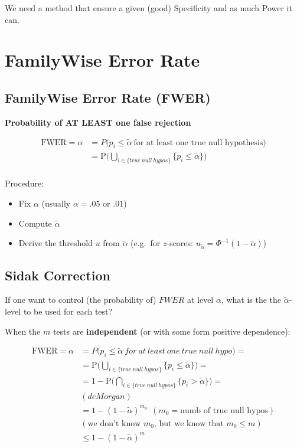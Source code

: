 \documentclass[]{article}
\providecommand{\tightlist}{%
  \setlength{\itemsep}{0pt}\setlength{\parskip}{0pt}}
\begin{document}
We need a method that ensure a given (good) Specificity and as much
Power it can.

\section{FamilyWise Error Rate}\label{familywise-error-rate}

\subsection{FamilyWise Error Rate
(FWER)}\label{familywise-error-rate-fwer}

\textbf{Probability of AT LEAST one false rejection}

\[
\begin{aligned}
    \mathrm{FWER} =\alpha &= P \big(p_i \leq \widetilde{\alpha}\ \textrm{for at least one true null hypothesis} \big) \\
    &= \mathrm{P} \Big( \bigcup_{i\in \{true\ null\ hypos\}} \{p_i \leq \widetilde{\alpha}\} \Big) \\
\end{aligned}
\]

Procedure:

\begin{itemize}
\tightlist
\item
  Fix \(\alpha\) (usually \(\alpha=.05\) or \(.01\))
\item
  Compute \(\widetilde{\alpha}\)
\item
  Derive the threshold \(u\) from \(\widetilde{\alpha}\) (e.g.~for
  \(z\)-scores:
  \(u_{\widetilde{\alpha}}=\Phi^{-1}(1-\widetilde{\alpha})\))
\end{itemize}

\subsection{Sidak Correction}\label{sidak-correction}

If one want to control (the probability of) \(FWER\) at level
\(\alpha\), what is the the \(\widetilde{\alpha}\)-level to be used for
each test?

When the \(m\) tests are \textbf{independent} (or with some form
positive dependence):

\[
\begin{aligned}
    \mathrm{FWER}= \alpha &= P \big(p_i \leq \widetilde{\alpha}\ for\ at\ least\ one\ true\ null\ hypo \big) = \\
    &= \mathrm{P} \Big( \bigcup_{i\in \{true\ null\ hypos\}} \{p_i \leq \widetilde{\alpha}\} \Big) =\\
    &= 1 - \mathrm{P} \Big( \bigcap_{i\in \{true\ null\ hypos\}} \{p_i > \widetilde{\alpha}\} \Big) = \\
    & (de Morgan)\\
    &= 1 - (1- \widetilde{\alpha})^{m_0}\ \ (m_0= \textrm{numb of true null hypos}) \\
    & (\textrm{we don't know $m_0$, but we know that $m_0\leq m$})\\
    &\leq 1 - (1- \widetilde{\alpha})^{m} 
\end{aligned}
\]
\end{document}
